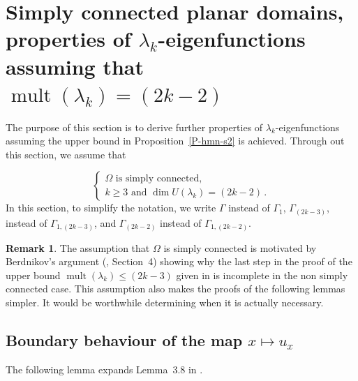 \documentclass[12pt,a4paper]{amsart}
\theoremstyle{plain} %
\theoremstyle{definition}
\newtheorem{remark}[theorem]{Remark}
\numberwithin{equation}{section}
\numberwithin{figure}{section}
\numberwithin{table}{section}
\DeclareMathOperator{\mult}{mult}
\begin{document}
\section{Simply connected planar domains, properties of $\lambda_k$-eigenfunctions assuming that $\mult(\lambda_k) = (2k-2)$}\label{S-hmn4}


The purpose of this section is to derive further properties of $\lambda_k$-eigenfunctions assuming the upper bound in Proposition~\ref{P-hmn-s2} is achieved. Through out this section, we assume that

\begin{equation}\label{E-hmn-bs}
\left\{
\begin{array}{l}
\Omega \text{~is simply connected,}\\[5pt]
k \ge 3 \text{~and~} \dim U(\lambda_k) = (2k-2)\,.
\end{array}%
\right.
\end{equation}
%
In this section, to simplify the notation, we write $\Gamma$ instead of $\Gamma_1$, $\Gamma_{(2k-3)}$, instead of $\Gamma_{1,(2k-3)}$,  and $\Gamma_{(2k-2)}$ instead of $\Gamma_{1,(2k-2)}$.

\begin{remark}\label{R-simply}
 The assumption that $\Omega$ is simply connected is motivated by Berdnikov's argument (\cite{Berd2018}, Section~4)  showing why the last step in the proof of the upper bound $\mult(\lambda_k) \le (2k-3)$ given in \cite{HoMN1999} is incomplete in the non simply connected case. This assumption also makes the proofs of the following lemmas simpler. It would be worthwhile determining when it is actually necessary.
\end{remark}%


\subsection{Boundary behaviour of the map $x \mapsto u_x$}\label{SS-hmn31}

The following lemma expands Lemma~3.8 in \cite[p.~1184]{HoMN1999}.
\end{document}
